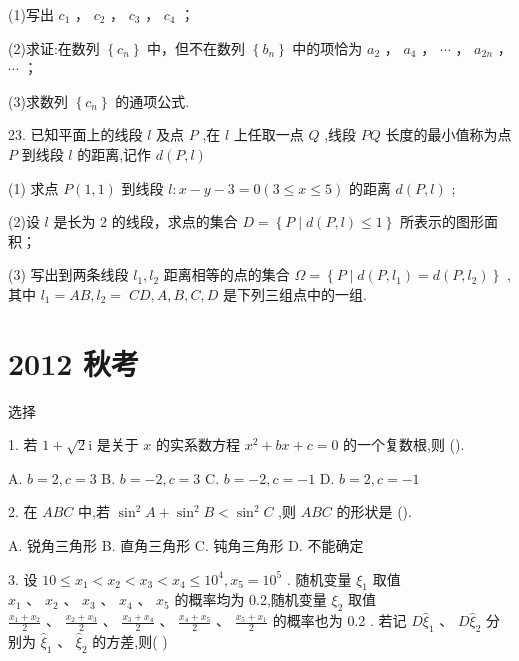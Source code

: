 \documentclass[10pt]{article}
\begin{document}
(1)写出 \({c}_{1}\) ， \({c}_{2}\) ， \({c}_{3}\) ， \({c}_{4}\) ；

(2)求证:在数列 \(\left\{  {c}_{n}\right\}\) 中，但不在数列 \(\left\{  {b}_{n}\right\}\) 中的项恰为 \({a}_{2}\) ， \({a}_{4}\) ， \(\cdots\) ， \({a}_{2n}\) ， \(\cdots\) ；

(3)求数列 \(\left\{  {c}_{n}\right\}\) 的通项公式.

23. 已知平面上的线段 \(l\) 及点 \(P\) ,在 \(l\) 上任取一点 \(Q\) ,线段 \({PQ}\) 长度的最小值称为点 \(P\) 到线段 \(l\) 的距离,记作 \(d\left( {P,l}\right)\)

(1) 求点 \(P\left( {1,1}\right)\) 到线段 \(l : x - y - 3 = 0\left( {3 \leq  x \leq  5}\right)\) 的距离 \(d\left( {P,l}\right)\) ;

(2)设 \(l\) 是长为 2 的线段，求点的集合 \(D = \left\{  {P \mid  d\left( {P,l}\right)  \leq  1}\right\}\) 所表示的图形面积；

(3) 写出到两条线段 \({l}_{1},{l}_{2}\) 距离相等的点的集合 \(\Omega  = \left\{  {P \mid  d\left( {P,{l}_{1}}\right)  = d\left( {P,{l}_{2}}\right) }\right\}\) ,其中 \({l}_{1} = {AB},{l}_{2} = \; {CD},A,B,C,D\) 是下列三组点中的一组.

\section*{2012 秋考}

选择

1. 若 \(1 + \sqrt{2}\mathrm{i}\) 是关于 \(x\) 的实系数方程 \({x}^{2} + {bx} + c = 0\) 的一个复数根,则 ().

A. \(b = 2,c = 3\) B. \(b =  - 2,c = 3\) C. \(b =  - 2,c =  - 1\) D. \(b = 2,c =  - 1\)

2. 在 \({ABC}\) 中,若 \({\sin }^{2}A + {\sin }^{2}B < {\sin }^{2}C\) ,则 \({ABC}\) 的形状是 ().

A. 锐角三角形 B. 直角三角形 C. 钝角三角形 D. 不能确定

3. 设 \({10} \leq  {x}_{1} < {x}_{2} < {x}_{3} < {x}_{4} \leq  {10}^{4},{x}_{5} = {10}^{5}\) . 随机变量 \({\xi }_{1}\) 取值 \({x}_{1}\text{ 、 }{x}_{2}\text{ 、 }{x}_{3}\text{ 、 }{x}_{4}\text{ 、 }{x}_{5}\) 的概率均为 0.2,随机变量 \({\xi }_{2}\) 取值 \(\frac{{x}_{1} + {x}_{2}}{2}\text{ 、 }\frac{{x}_{2} + {x}_{3}}{2}\text{ 、 }\frac{{x}_{3} + {x}_{4}}{2}\text{ 、 }\frac{{x}_{4} + {x}_{5}}{2}\text{ 、 }\frac{{x}_{5} + {x}_{1}}{2}\) 的概率也为 0.2 . 若记 \(D{\widehat{\xi }}_{1}\text{ 、 }D{\widehat{\xi }}_{2}\) 分别为 \({\widehat{\xi }}_{1}\text{ 、 }{\widehat{\xi }}_{2}\) 的方差,则(   )
\end{document}
